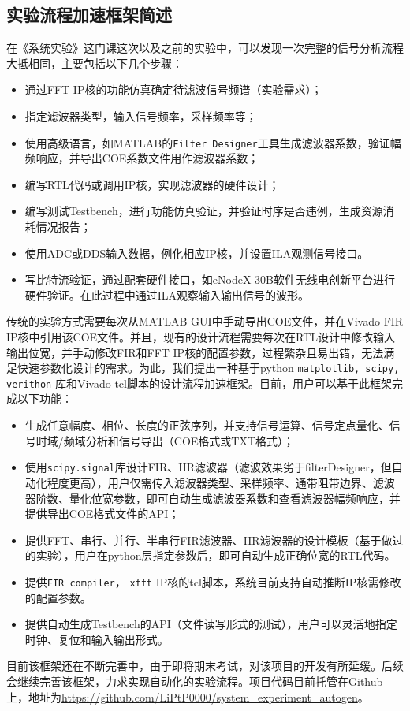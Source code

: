 \subsection{实验流程加速框架简述}
在《系统实验》这门课这次以及之前的实验中，可以发现一次完整的信号分析流程大抵相同，主要包括以下几个步骤：
\begin{itemize}
    \item 通过FFT IP核的功能仿真确定待滤波信号频谱（实验需求）；
    \item 指定滤波器类型，输入信号频率，采样频率等；
    \item 使用高级语言，如MATLAB的\texttt{Filter Designer}工具生成滤波器系数，验证幅频响应，并导出COE系数文件用作滤波器系数；
    \item 编写RTL代码或调用IP核，实现滤波器的硬件设计；
    \item 编写测试Testbench，进行功能仿真验证，并验证时序是否违例，生成资源消耗情况报告；
    \item 使用ADC或DDS输入数据，例化相应IP核，并设置ILA观测信号接口。
    \item 写比特流验证，通过配套硬件接口，如eNodeX 30B软件无线电创新平台进行硬件验证。在此过程中通过ILA观察输入输出信号的波形。
\end{itemize}

传统的实验方式需要每次从MATLAB GUI中手动导出COE文件，并在Vivado FIR IP核中引用该COE文件。并且，现有的设计流程需要每次在RTL设计中修改输入输出位宽，并手动修改FIR和FFT IP核的配置参数，过程繁杂且易出错，无法满足快速参数化设计的需求。为此，我们提出一种基于python \texttt{matplotlib, scipy, verithon} 库和Vivado tcl脚本的设计流程加速框架。目前，用户可以基于此框架完成以下功能：
\begin{itemize}
    \item 生成任意幅度、相位、长度的正弦序列，并支持信号运算、信号定点量化、信号时域/频域分析和信号导出（COE格式或TXT格式）；
    \item 使用\texttt{scipy.signal}库设计FIR、IIR滤波器（滤波效果劣于filterDesigner，但自动化程度更高），用户仅需传入滤波器类型、采样频率、通带阻带边界、滤波器阶数、量化位宽参数，即可自动生成滤波器系数和查看滤波器幅频响应，并提供导出COE格式文件的API；
    \item 提供FFT、串行、并行、半串行FIR滤波器、IIR滤波器的设计模板（基于做过的实验），用户在python层指定参数后，即可自动生成正确位宽的RTL代码。
    \item 提供\texttt{FIR compiler}， \texttt{xfft} IP核的tcl脚本，系统目前支持自动推断IP核需修改的配置参数。
    \item 提供自动生成Testbench的API（文件读写形式的测试），用户可以灵活地指定时钟、复位和输入输出形式。
\end{itemize}

目前该框架还在不断完善中，由于即将期末考试，对该项目的开发有所延缓。后续会继续完善该框架，力求实现自动化的实验流程。项目代码目前托管在Github上，地址为\url{https://github.com/LiPtP0000/system_experiment_autogen}。